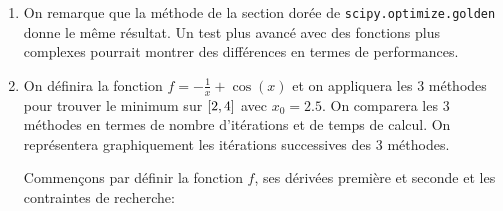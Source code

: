 {\begin{td-sol}
\begin{enumerate}
            \begin{minipage}{\textwidth}
                \centering
            \end{minipage}
            \vspace{5pt}

            \item On remarque que la méthode de la section dorée de \texttt{scipy.optimize.golden} 
            donne le même résultat. Un test plus avancé avec des fonctions plus complexes
            pourrait montrer des différences en termes de performances.
            
            \vspace{5pt}
            \begin{minipage}{\textwidth}
                \centering
            \end{minipage}
            \vspace{5pt}
            

            \item On définira la fonction \(f = -\frac1x +\cos(x)\) et on appliquera les 3 méthodes
            pour trouver le minimum sur \(\mathopen{}\left[2,4\right]\mathclose{}\) avec \(x_0 = 2.5\). On comparera
            les 3 méthodes en termes de nombre d'itérations et de temps de calcul.
            On représentera graphiquement les itérations successives des 3 méthodes.

            Commençons par définir la fonction \(f\), ses dérivées première et seconde et les contraintes
            de recherche:
            

\end{enumerate}
\end{td-sol}}
